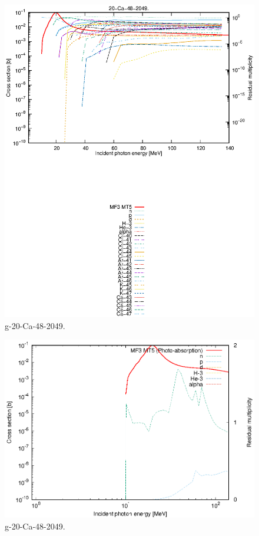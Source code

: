 \begin{figure}
 \includegraphics[width=\linewidth]{eps/g_20-Ca-48_2049.eps}
  \caption{g-20-Ca-48-2049.}
\end{figure}
\newpage \clearpage

\begin{figure}
 \includegraphics[width=\linewidth]{eps-log/g_20-Ca-48_2049.eps}
 \caption{g-20-Ca-48-2049.}
\end{figure}
\newpage \clearpage

